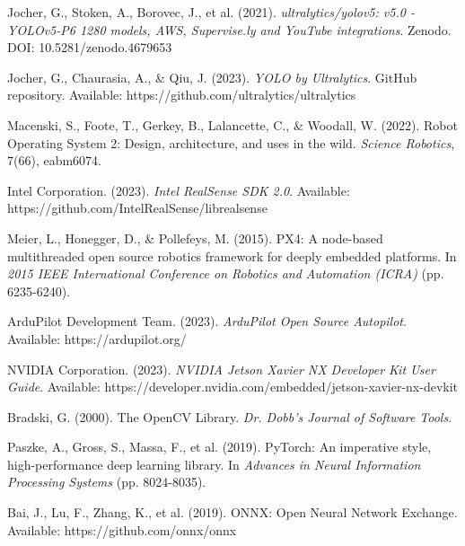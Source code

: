 \documentclass[11pt,a4paper]{article}
\begin{document}
\begin{thebibliography}{99}

Jocher, G., Stoken, A., Borovec, J., et al. (2021). \textit{ultralytics/yolov5: v5.0 - YOLOv5-P6 1280 models, AWS, Supervise.ly and YouTube integrations}. Zenodo. DOI: 10.5281/zenodo.4679653

Jocher, G., Chaurasia, A., \& Qiu, J. (2023). \textit{YOLO by Ultralytics}. GitHub repository. Available: https://github.com/ultralytics/ultralytics

Macenski, S., Foote, T., Gerkey, B., Lalancette, C., \& Woodall, W. (2022). Robot Operating System 2: Design, architecture, and uses in the wild. \textit{Science Robotics}, 7(66), eabm6074.

Intel Corporation. (2023). \textit{Intel RealSense SDK 2.0}. Available: https://github.com/IntelRealSense/librealsense

Meier, L., Honegger, D., \& Pollefeys, M. (2015). PX4: A node-based multithreaded open source robotics framework for deeply embedded platforms. In \textit{2015 IEEE International Conference on Robotics and Automation (ICRA)} (pp. 6235-6240).

ArduPilot Development Team. (2023). \textit{ArduPilot Open Source Autopilot}. Available: https://ardupilot.org/

NVIDIA Corporation. (2023). \textit{NVIDIA Jetson Xavier NX Developer Kit User Guide}. Available: https://developer.nvidia.com/embedded/jetson-xavier-nx-devkit

Bradski, G. (2000). The OpenCV Library. \textit{Dr. Dobb's Journal of Software Tools}.

Paszke, A., Gross, S., Massa, F., et al. (2019). PyTorch: An imperative style, high-performance deep learning library. In \textit{Advances in Neural Information Processing Systems} (pp. 8024-8035).

Bai, J., Lu, F., Zhang, K., et al. (2019). ONNX: Open Neural Network Exchange. Available: https://github.com/onnx/onnx

\end{thebibliography}
\end{document}
